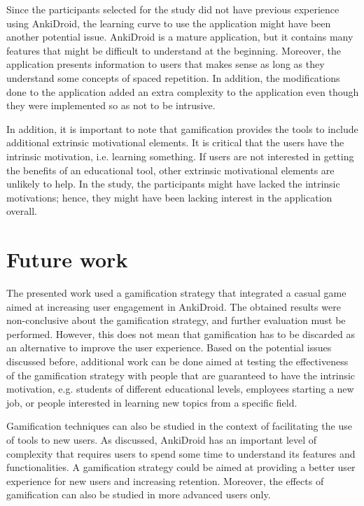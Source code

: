Since the participants selected for the study did not have previous experience using AnkiDroid, the learning curve to use the application might have been another potential issue. AnkiDroid is a mature application, but it contains many features that might be difficult to understand at the beginning. Moreover, the application presents information to users that makes sense as long as they understand some concepts of spaced repetition. In addition, the modifications done to the application added an extra complexity to the application even though they were implemented so as not to be intrusive.

In addition, it is important to note that gamification provides the tools to include additional extrinsic motivational elements. It is critical that the users have the intrinsic motivation, i.e. learning something. If users are not interested in getting the benefits of an educational tool, other extrinsic motivational elements are unlikely to help. In the study, the participants might have lacked the intrinsic motivations; hence, they might have been lacking interest in the application overall.

\section{Future work}
The presented work used a gamification strategy that integrated a casual game aimed at increasing user engagement in AnkiDroid. The obtained results were non-conclusive about the gamification strategy, and further evaluation must be performed. However, this does not mean that gamification has to be discarded as an alternative to improve the user experience. Based on the potential issues discussed before, additional work can be done aimed at testing the effectiveness of the gamification strategy with people that are guaranteed to have the intrinsic motivation, e.g. students of different educational levels, employees starting a new job, or people interested in learning new topics from a specific field.

Gamification techniques can also be studied in the context of facilitating the use of tools to new users. As discussed, AnkiDroid has an important level of complexity that requires users to spend some time to understand its features and functionalities. A gamification strategy could be aimed at providing a better user experience for new users and increasing retention. Moreover, the effects of gamification can also be studied in more advanced users only.